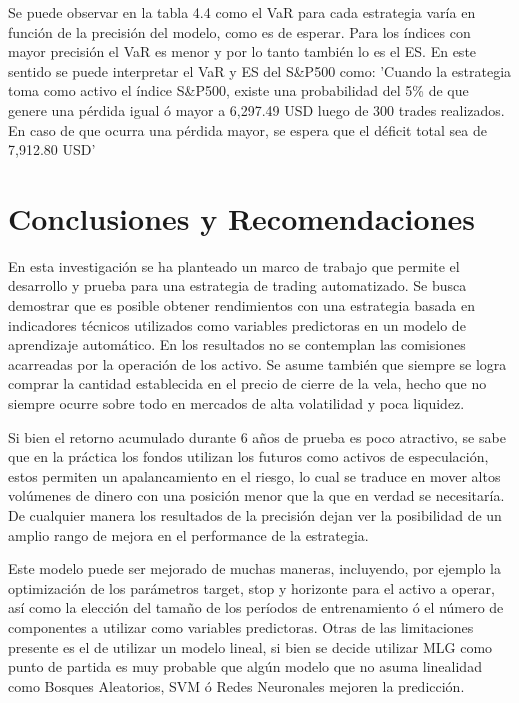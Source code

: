 \documentclass[a4paper,12pt]{Latex/Classes/PhDthesisPSnPDF}
\begin{document}
Se puede observar en la tabla 4.4 como el VaR para cada estrategia varía en función de la precisión del modelo, como es de esperar. Para los índices con mayor precisión el VaR es menor y por lo tanto también lo es el ES. En este sentido se puede interpretar el VaR y ES del S\&P500 como: 'Cuando la estrategia toma como activo el índice S\&P500, existe una probabilidad del 5\% de que genere una pérdida igual ó mayor a 6,297.49 USD luego de 300 trades realizados. En caso de que ocurra una pérdida mayor, se espera que el déficit total sea de 7,912.80 USD'

\chapter*{Conclusiones y Recomendaciones}

En esta investigación se ha planteado un marco de trabajo que permite el desarrollo y prueba para una estrategia de trading automatizado. Se busca demostrar que es posible obtener rendimientos con una estrategia basada en indicadores técnicos utilizados como variables predictoras en un modelo de aprendizaje automático. En los resultados no se contemplan las comisiones acarreadas por la operación de los activo. Se asume también que siempre se logra comprar la cantidad establecida en el precio de cierre de la vela, hecho que no siempre ocurre sobre todo en mercados de alta volatilidad y poca liquidez.

Si bien el retorno acumulado durante 6 años de prueba es poco atractivo, se sabe que en la práctica los fondos utilizan los futuros como activos de especulación, estos permiten un apalancamiento en el riesgo, lo cual se traduce en mover altos volúmenes de dinero con una posición menor que la que en verdad se necesitaría. De cualquier manera los resultados de la precisión dejan ver la posibilidad de un amplio rango de mejora en el performance de la estrategia. 

Este modelo puede ser mejorado de muchas maneras, incluyendo, por ejemplo la optimización de los parámetros target, stop y horizonte para el activo a operar, así como la elección del tamaño de los períodos de entrenamiento ó el número de componentes a utilizar como variables predictoras. Otras de las limitaciones presente es el de utilizar un modelo lineal, si bien se decide utilizar MLG como punto de partida es muy probable que algún modelo que no asuma linealidad como Bosques Aleatorios, SVM ó Redes Neuronales mejoren la predicción. 
\end{document}

